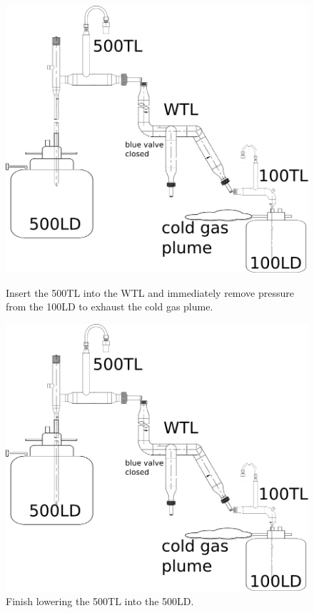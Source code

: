  \begin{figure}[htbp!]
 \centering
 \begin{minipage}{\textwidth}
 \includegraphics[height=.40\textheight]{./img/100LDfill-05-insert-500TL.png}
 \caption{Insert the 500TL into the WTL and immediately remove pressure from the 100LD to exhaust the cold gas plume.}
 \label{fig:100LDfill-05-insert-500TL}
 \end{minipage}
 \quad
 \begin{minipage}{\textwidth}
 \includegraphics[height=.45\textheight]{./img/100LDfill-06-insert-500TL.png}
 \caption{Finish lowering the 500TL into the 500LD.}
 \label{fig:100LDfill-06-insert-500TL}
 \end{minipage}
\end{figure}

